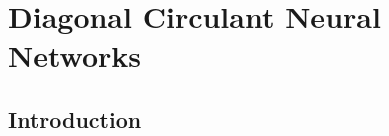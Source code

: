 \chapter{Diagonal Circulant Neural Networks}
\label{chapter:diagonal_circulant_neural_network}
\localtableofcontents


\section{Introduction}
\label{chapter:p1-ch4_introduction}

